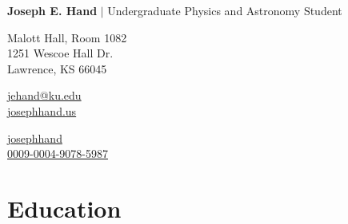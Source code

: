 \documentclass[12pt]{article}
\newcommand{\contactinfo}[3]{
    #1\hspace{6pt}\href{#2}{#3}\hspace{6pt}
}
\begin{document}
\setlength{\parindent}{0pt}

\thispagestyle{plain}

{\LARGE\textbf{Joseph E. Hand} $\vert$} Undergraduate Physics and Astronomy Student\bigskip

\begin{minipage}{\dimexpr\textwidth/3}
  Malott Hall, Room 1082\\
  1251 Wescoe Hall Dr.\\
  Lawrence, KS 66045
\end{minipage}
\begin{minipage}{\dimexpr\textwidth/3}
  \contactinfo{\faEnvelope}{mailto:jehand@ku.edu}{jehand@ku.edu}\\
  \contactinfo{\faGlobe}{https://josephhand.us}{josephhand.us}\\
\end{minipage}
\begin{minipage}{\dimexpr\textwidth/3}
  \contactinfo{\faGithub}{https://github.com/josephhand}{josephhand}\\
  \contactinfo{\aiOrcid}{https://orcid.org/0009-0004-9078-5987}{0009-0004-9078-5987}\\
\end{minipage}
\medskip



%

\newenvironment{education}[4]{
  \medskip
  \begin{minipage}[t]{0.75in}
    #3
  \end{minipage}
  \begin{minipage}[t]{\dimexpr\textwidth-0.75in}
    \textbf{#1}, \textit{#2}

    #4
    
    \smallskip
}{
  \end{minipage}
}

\vspace{-3ex}
\section*{Education}\vspace{-1ex}\vspace{-1ex}
\end{document}
